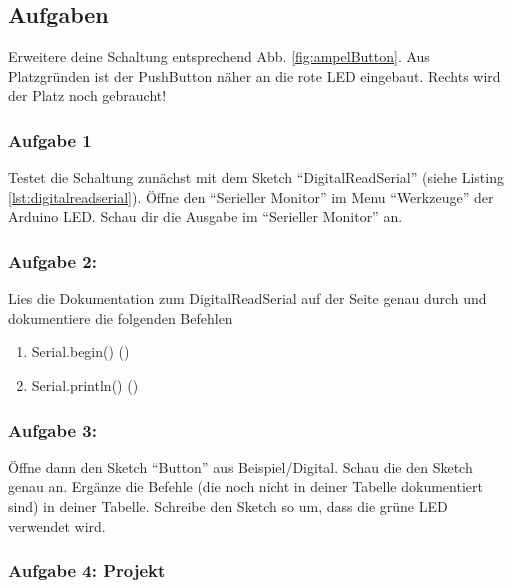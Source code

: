 \subsection{Aufgaben}


Erweitere deine Schaltung entsprechend Abb. \ref{fig:ampelButton}. Aus Platzgründen ist der PushButton näher an die rote LED eingebaut. Rechts wird der Platz noch gebraucht!
 
\subsubsection*{Aufgabe 1}

Testet die Schaltung zunächst mit dem Sketch ``DigitalReadSerial'' (siehe Listing \ref{lst:digitalreadserial}). Öffne den  ``Serieller Monitor'' im Menu ``Werkzeuge'' der Arduino LED. Schau dir die Ausgabe im ``Serieller Monitor'' an.

\subsubsection*{Aufgabe 2:}

Lies die Dokumentation zum DigitalReadSerial auf der Seite  genau durch und dokumentiere die folgenden Befehlen
  \begin{enumerate}
    \item Serial.begin()  ()
    \item Serial.println()  ()
  \end{enumerate}
  
\subsubsection*{Aufgabe 3:}

Öffne dann den Sketch ``Button''  aus Beispiel/Digital. Schau die den Sketch genau an. Ergänze die Befehle (die noch nicht in deiner Tabelle dokumentiert sind) in deiner Tabelle. Schreibe den Sketch so um, dass die grüne LED verwendet wird.

\subsubsection*{Aufgabe 4: Projekt}


